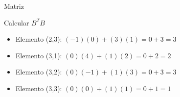 \documentclass[11pt,letterpaper]{article}
\begin{document}
\begin{inciso}{Matriz}
\begin{problem}{Calcular \( B^TB \)}
\begin{itemize}
  \item  Elemento (2,3):  
    \( (-1)(0) + (3)(1) = 0 + 3 = 3 \)  
  
  \item  Elemento (3,1):  
    \( (0)(4) + (1)(2) = 0 + 2 = 2 \)  
  
  \item  Elemento (3,2):  
    \( (0)(-1) + (1)(3) = 0 + 3 = 3 \)  
  
  \item  Elemento (3,3):  
    \( (0)(0) + (1)(1) = 0 + 1 = 1 \) 
\end{itemize}

\begin{center}
\end{center}
\end{problem}

\end{inciso}
\end{document}
